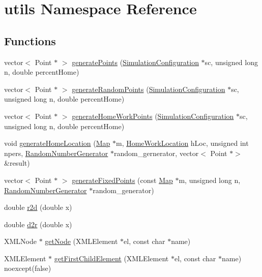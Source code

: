 \hypertarget{namespaceutils}{}\section{utils Namespace Reference}
\label{namespaceutils}
\subsection*{Functions}
\begin{DoxyCompactItemize}
\item 
vector$<$ Point $\ast$ $>$ \hyperlink{namespaceutils_a48a29442f25828b253a68ec62dde4ef8}{generate\+Points} (\hyperlink{class_simulation_configuration}{Simulation\+Configuration} $\ast$sc, unsigned long n, double percent\+Home)
\item 
vector$<$ Point $\ast$ $>$ \hyperlink{namespaceutils_a40ef7258cb6dade6a56123b16fec4e9b}{generate\+Random\+Points} (\hyperlink{class_simulation_configuration}{Simulation\+Configuration} $\ast$sc, unsigned long n, double percent\+Home)
\item 
vector$<$ Point $\ast$ $>$ \hyperlink{namespaceutils_a60674386468ac1970ec834927a90e6a0}{generate\+Home\+Work\+Points} (\hyperlink{class_simulation_configuration}{Simulation\+Configuration} $\ast$sc, unsigned long n, double percent\+Home)
\item 
void \hyperlink{namespaceutils_ab4bf690ba2e57ea5479693d934e6a1a3}{generate\+Home\+Location} (\hyperlink{class_map}{Map} $\ast$m, \hyperlink{class_home_work_location}{Home\+Work\+Location} h\+Loc, unsigned int npers, \hyperlink{class_random_number_generator}{Random\+Number\+Generator} $\ast$random\+\_\+gernerator, vector$<$ Point $\ast$$>$ \&result)
\item 
vector$<$ Point $\ast$ $>$ \hyperlink{namespaceutils_ac8e4765c82d19bad7a35baa72690418d}{generate\+Fixed\+Points} (const \hyperlink{class_map}{Map} $\ast$m, unsigned long n, \hyperlink{class_random_number_generator}{Random\+Number\+Generator} $\ast$random\+\_\+generator)
\item 
double \hyperlink{namespaceutils_af70f6f3c2ac66aa3b4ce64a3b48288cb}{r2d} (double x)
\item 
double \hyperlink{namespaceutils_a1d747e438d856e6c46cd1fe558fe3821}{d2r} (double x)
\item 
X\+M\+L\+Node $\ast$ \hyperlink{namespaceutils_a707d0fc1b0346b7da16a6f7714a7f24d}{get\+Node} (X\+M\+L\+Element $\ast$el, const char $\ast$name)
\item 
X\+M\+L\+Element $\ast$ \hyperlink{namespaceutils_a929f9a6daaf5e504356ea4af5918c34b}{get\+First\+Child\+Element} (X\+M\+L\+Element $\ast$el, const char $\ast$name) noexcept(false)
$$
\end{DoxyCompactItemize}
